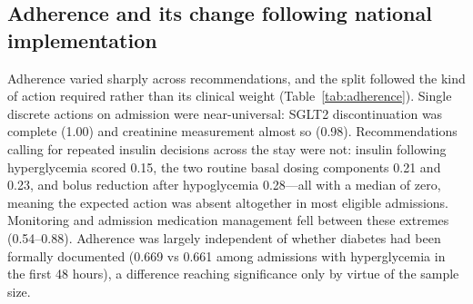 \subsection{Adherence and its change following national implementation}
\label{sec:adherence-results}

Adherence varied sharply across recommendations, and the split followed the
kind of action required rather than its clinical weight
(Table~\ref{tab:adherence}). Single discrete actions on admission were
near-universal: SGLT2 discontinuation was complete (1.00) and creatinine
measurement almost so (0.98). Recommendations calling for repeated insulin
decisions across the stay were not: insulin following hyperglycemia scored 0.15, the
two routine basal dosing components 0.21 and 0.23, and bolus reduction after
hypoglycemia 0.28---all with a median of zero, meaning the expected action
was absent altogether in most eligible admissions. Monitoring and admission
medication management fell between these extremes (0.54--0.88). Adherence was
largely independent of whether diabetes had been formally documented (0.669 vs
0.661 among admissions with hyperglycemia in the first 48 hours), a difference
reaching significance only by virtue of the sample size.

